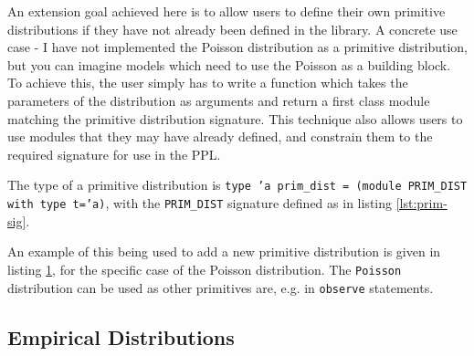An extension goal achieved here is to allow users to define their own primitive distributions if they have not already been defined in the library. A concrete use case - I have not implemented the Poisson distribution as a primitive distribution, but you can imagine models which need to use the Poisson as a building block. To achieve this, the user simply has to write a function which takes the parameters of the distribution as arguments and return a first class module matching the primitive distribution signature. This technique also allows users to use modules that they may have already defined, and constrain them to the required signature for use in the PPL.
	
The type of a primitive distribution is \texttt{type 'a prim\_dist = (module PRIM\_DIST with type t='a)}, with the \texttt{PRIM\_DIST} signature defined as in listing \ref{lst:prim-sig}. 
	
\begin{figure}[!htb]
	\begin{minipage}{0.5\textwidth}
		\label{lst:prim-sig}
	\end{minipage}
	\begin{minipage}{0.5\textwidth}
		\label{lst:new-dist}
	\end{minipage}
\end{figure}
	
	
An example of this being used to add a new primitive distribution is given in listing \ref{lst:new-dist}, for the specific case of the Poisson distribution. The \texttt{Poisson} distribution can be used as other primitives are, e.g. in \texttt{observe} statements.
	
	
\subsection{Empirical Distributions}
	
